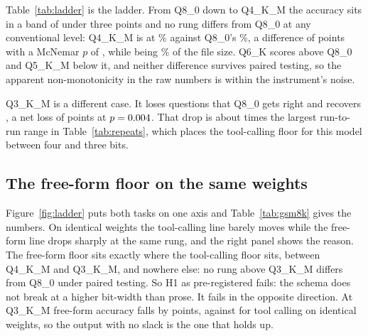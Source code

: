 \documentclass[11pt]{article}
\begin{document}
Table~\ref{tab:ladder} is the ladder. From Q8\_0 down to Q4\_K\_M the accuracy sits in a band of under three points and no rung differs from Q8\_0 at any conventional level: Q4\_K\_M is at \qtAccFour{}\% against Q8\_0's \qtAccEight{}\%, a difference of \qtDeltaFour{} points with a McNemar $p$ of \qtPFour{}, while being \qtSizeRatioFour{}\% of the file size. Q6\_K scores above Q8\_0 and Q5\_K\_M below it, and neither difference survives paired testing, so the apparent non-monotonicity in the raw numbers is within the instrument's noise.

Q3\_K\_M is a different case. It loses \qtLostThree{} questions that Q8\_0 gets right and recovers \qtGainedThree{}, a net loss of \qtDropThree{} points at $p=0.004{}$. That drop is about \qtCliffOverNoise{} times the largest run-to-run range in Table~\ref{tab:repeats}, which places the tool-calling floor for this model between four and three bits.

\begin{table}[t]
\centering\small

\caption{The quantization ladder on \texttt{simple\_python}, $n=\qtN{}$ per rung, all rungs from one FP16 source. Lost and gained count questions that flip against Q8\_0; $p$ is McNemar's exact test on those discordant pairs.}
\label{tab:ladder}
\end{table}

\subsection{The free-form floor on the same weights}
\label{sec:freeform}

Figure~\ref{fig:ladder} puts both tasks on one axis and Table~\ref{tab:gsm8k} gives the numbers. On identical weights the tool-calling line barely moves while the free-form line drops sharply at the same rung, and the right panel shows the reason. The free-form floor sits exactly where the tool-calling floor sits, between Q4\_K\_M and Q3\_K\_M, and nowhere else: no rung above Q3\_K\_M differs from Q8\_0 under paired testing. So H1 as pre-registered fails: the schema does not break at a higher bit-width than prose. It fails in the opposite direction. At Q3\_K\_M free-form accuracy falls by \qtGsmDropThree{} points, against \qtDropThree{} for tool calling on identical weights, so the output with no slack is the one that holds up.
\end{document}
